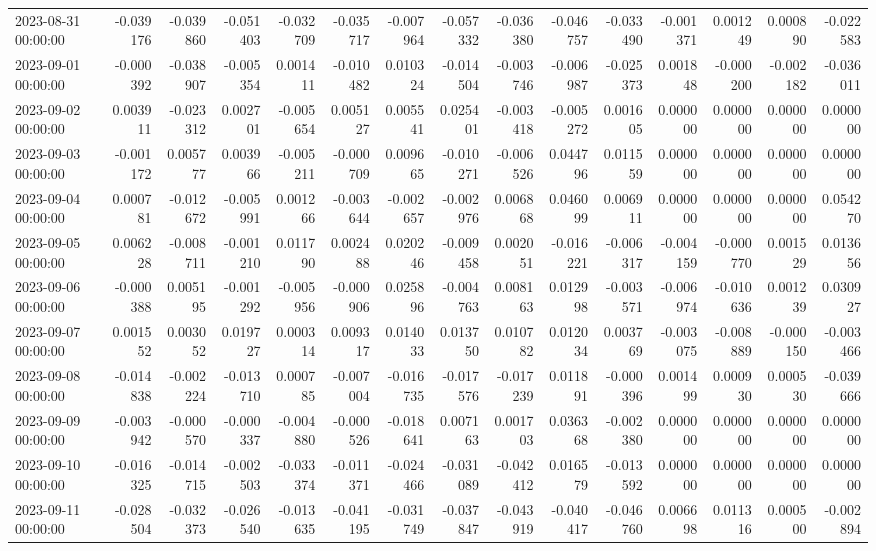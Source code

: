 \begin{tabular}{lrrrrrrrrrrrrrr}
2023-08-31 00:00:00 & -0.039176 & -0.039860 & -0.051403 & -0.032709 & -0.035717 & -0.007964 & -0.057332 & -0.036380 & -0.046757 & -0.033490 & -0.001371 & 0.001249 & 0.000890 & -0.022583 \\
2023-09-01 00:00:00 & -0.000392 & -0.038907 & -0.005354 & 0.001411 & -0.010482 & 0.010324 & -0.014504 & -0.003746 & -0.006987 & -0.025373 & 0.001848 & -0.000200 & -0.002182 & -0.036011 \\
2023-09-02 00:00:00 & 0.003911 & -0.023312 & 0.002701 & -0.005654 & 0.005127 & 0.005541 & 0.025401 & -0.003418 & -0.005272 & 0.001605 & 0.000000 & 0.000000 & 0.000000 & 0.000000 \\
2023-09-03 00:00:00 & -0.001172 & 0.005777 & 0.003966 & -0.005211 & -0.000709 & 0.009665 & -0.010271 & -0.006526 & 0.044796 & 0.011559 & 0.000000 & 0.000000 & 0.000000 & 0.000000 \\
2023-09-04 00:00:00 & 0.000781 & -0.012672 & -0.005991 & 0.001266 & -0.003644 & -0.002657 & -0.002976 & 0.006868 & 0.046099 & 0.006911 & 0.000000 & 0.000000 & 0.000000 & 0.054270 \\
2023-09-05 00:00:00 & 0.006228 & -0.008711 & -0.001210 & 0.011790 & 0.002488 & 0.020246 & -0.009458 & 0.002051 & -0.016221 & -0.006317 & -0.004159 & -0.000770 & 0.001529 & 0.013656 \\
2023-09-06 00:00:00 & -0.000388 & 0.005195 & -0.001292 & -0.005956 & -0.000906 & 0.025896 & -0.004763 & 0.008163 & 0.012998 & -0.003571 & -0.006974 & -0.010636 & 0.001239 & 0.030927 \\
2023-09-07 00:00:00 & 0.001552 & 0.003052 & 0.019727 & 0.000314 & 0.009317 & 0.014033 & 0.013750 & 0.010782 & 0.012034 & 0.003769 & -0.003075 & -0.008889 & -0.000150 & -0.003466 \\
2023-09-08 00:00:00 & -0.014838 & -0.002224 & -0.013710 & 0.000785 & -0.007004 & -0.016735 & -0.017576 & -0.017239 & 0.011891 & -0.000396 & 0.001499 & 0.000930 & 0.000530 & -0.039666 \\
2023-09-09 00:00:00 & -0.003942 & -0.000570 & -0.000337 & -0.004880 & -0.000526 & -0.018641 & 0.007163 & 0.001703 & 0.036368 & -0.002380 & 0.000000 & 0.000000 & 0.000000 & 0.000000 \\
2023-09-10 00:00:00 & -0.016325 & -0.014715 & -0.002503 & -0.033374 & -0.011371 & -0.024466 & -0.031089 & -0.042412 & 0.016579 & -0.013592 & 0.000000 & 0.000000 & 0.000000 & 0.000000 \\
2023-09-11 00:00:00 & -0.028504 & -0.032373 & -0.026540 & -0.013635 & -0.041195 & -0.031749 & -0.037847 & -0.043919 & -0.040417 & -0.046760 & 0.006698 & 0.011316 & 0.000500 & -0.002894 \\

\end{tabular}
